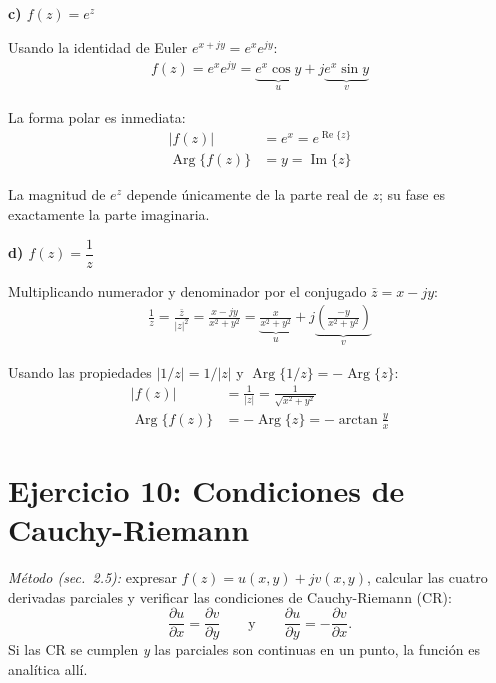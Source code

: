 \documentclass[10pt,a4paper]{article}
\begin{document}
\bigskip

\noindent\textbf{c) $f(z) = e^z$}

Usando la identidad de Euler $e^{x+jy} = e^x e^{jy}$:
\begin{align*}
	f(z) = e^x e^{jy} = \underbrace{e^x\cos y}_{u} + j\underbrace{e^x\sin y}_{v}
\end{align*}

La forma polar es inmediata:
\begin{align*}
	|f(z)| &= e^x = e^{\operatorname{Re}\{z\}} \\
	\operatorname{Arg}\{f(z)\} &= y = \operatorname{Im}\{z\}
\end{align*}

\noindent La magnitud de $e^z$ depende únicamente de la parte real de $z$; su fase es exactamente la parte imaginaria.

\bigskip

\noindent\textbf{d) $f(z) = \dfrac{1}{z}$}

Multiplicando numerador y denominador por el conjugado $\bar{z} = x-jy$:
\begin{align*}
	\frac{1}{z} = \frac{\bar{z}}{|z|^2} = \frac{x-jy}{x^2+y^2}
	= \underbrace{\frac{x}{x^2+y^2}}_{u} + j\underbrace{\!\left(\!\frac{-y}{x^2+y^2}\!\right)}_{\!v}
\end{align*}

Usando las propiedades $|1/z|=1/|z|$ y $\operatorname{Arg}\{1/z\}=-\operatorname{Arg}\{z\}$:
\begin{align*}
	|f(z)| &= \frac{1}{|z|} = \frac{1}{\sqrt{x^2+y^2}} \\
	\operatorname{Arg}\{f(z)\} &= -\operatorname{Arg}\{z\} = -\arctan\!\frac{y}{x}
\end{align*}

\section*{Ejercicio 10: Condiciones de Cauchy-Riemann}

\noindent\textit{Método (sec.~2.5):} expresar $f(z)=u(x,y)+jv(x,y)$, calcular las cuatro derivadas parciales y verificar las condiciones de Cauchy-Riemann (CR):
\[
	\frac{\partial u}{\partial x} = \frac{\partial v}{\partial y}
	\qquad\text{y}\qquad
	\frac{\partial u}{\partial y} = -\frac{\partial v}{\partial x}.
\]
Si las CR se cumplen \emph{y} las parciales son continuas en un punto, la función es analítica allí.
\end{document}
